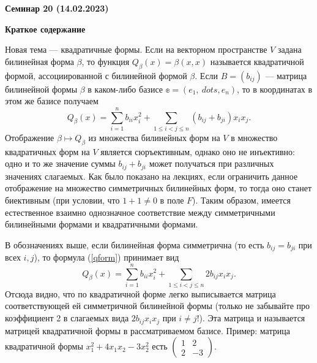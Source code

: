 \documentclass[10pt, a4paper]{extarticle}
\renewcommand{\le}{\leqslant}
\theoremstyle{definition}
\begin{document}
\begin{center}
\small
\noindent{}
\end{center}

\large

\begin{center}
\textbf{Семинар 20 (14.02.2023)}
\end{center}

\textbf{Краткое содержание}

Новая тема --- квадратичные формы.
Если на векторном пространстве $V$ задана билинейная форма $\beta$, то функция $Q_\beta(x) = \beta(x,x)$ называется квадратичной формой, ассоциированной с билинейной формой $\beta$.
Если $B = (b_{ij})$ --- матрица билинейной формы $\beta$ в каком-либо базисе $\mathbb e = (e_1,\ dots, e_n)$, то в координатах в этом же базисе получаем
\begin{equation} \label{qform}
Q_\beta(x) = \sum \limits_{i=1}^nb_{ii}x_i^2 + \sum \limits_{1 \le i<j \le n}(b_{ij} + b_{ji})x_ix_j.
\end{equation}
Отображение $\beta \mapsto Q_\beta$ из множества билинейных форм на $V$ в множество квадратичных форм на $V$ является сюръективным, однако оно не инъективно: одно и то же значение суммы $b_{ij} + b_{ji}$ может получаться при различных значениях слагаемых.
Как было показано на лекциях, если ограничить данное отображение на множество симметричных билинейных форм, то тогда оно станет биективным (при условии, что $1+1 \ne 0$ в поле $F$).
Таким образом, имеется естественное взаимно однозначное соответствие между симметричными билинейными формами и квадратичными формами.

В обозначениях выше, если билинейная форма симметрична (то есть $b_{ij} = b_{ji}$ при всех $i,j$), то формула (\ref{qform}) принимает вид
\begin{equation*} 
Q_\beta(x) = \sum \limits_{i=1}^nb_{ii}x_i^2 + \sum \limits_{1 \le i<j \le n}2b_{ij}x_ix_j.
\end{equation*}
Отсюда видно, что по квадратичной форме легко выписывается матрица соответствующей ей симметричной билинейной формы (только не забывайте про коэффициент 2 в слагаемых вида $2b_{ij}x_ix_j$ при $i \ne j$!).
Эта матрица и называется матрицей квадратичной формы в рассматриваемом базисе.
Пример: матрица квадратичной формы $x_1^2 + 4x_1x_2- 3x_2^2$ есть $\begin{pmatrix} 1 & 2 \\ 2 & -3 \end{pmatrix}$.
\end{document}
